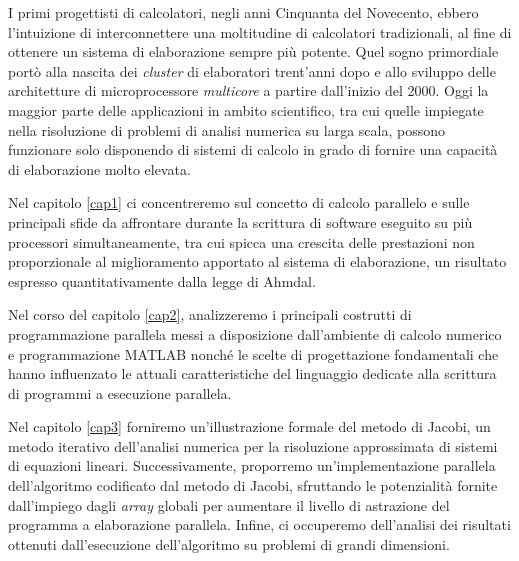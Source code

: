 I primi progettisti di calcolatori, negli anni Cinquanta del Novecento, ebbero l'intuizione di interconnettere
una moltitudine di calcolatori tradizionali, al fine di ottenere un sistema di elaborazione sempre più potente.\newline
Quel sogno primordiale port\`o alla nascita dei \textit{cluster} di elaboratori trent'anni dopo e allo sviluppo delle architetture di microprocessore
\textit{multicore} a partire dall'inizio del 2000.\newline
Oggi la maggior parte delle applicazioni in ambito scientifico, tra cui quelle impiegate nella risoluzione di problemi di analisi numerica
su larga scala, possono funzionare solo disponendo di sistemi di calcolo in grado di fornire una capacit\`a di elaborazione molto elevata.

Nel capitolo \ref{cap1} ci concentreremo sul concetto di calcolo parallelo e sulle principali sfide da affrontare
durante la scrittura di software eseguito su pi\`u processori simultaneamente, tra cui spicca una crescita delle prestazioni non proporzionale
al miglioramento apportato al sistema di elaborazione, un risultato espresso quantitativamente dalla legge di Ahmdal.

Nel corso del capitolo \ref{cap2}, analizzeremo i principali costrutti di programmazione parallela messi a disposizione dall’ambiente di calcolo numerico
e programmazione MATLAB\textsuperscript{\textregistered} nonch\'e le scelte di progettazione fondamentali che hanno influenzato
le attuali caratteristiche del linguaggio dedicate alla scrittura di programmi a esecuzione parallela.

Nel capitolo \ref{cap3} forniremo un'illustrazione formale del metodo di Jacobi, un metodo iterativo dell’analisi numerica per la risoluzione
approssimata di sistemi di equazioni lineari.\newline
Successivamente, proporremo un’implementazione parallela dell'algoritmo codificato dal metodo di Jacobi, sfruttando le potenzialità fornite
dall'impiego dagli \textit{array} globali per aumentare il livello di astrazione del programma a elaborazione parallela.\newline
Infine, ci occuperemo dell’analisi dei risultati ottenuti dall’esecuzione dell’algoritmo su problemi di grandi dimensioni.
